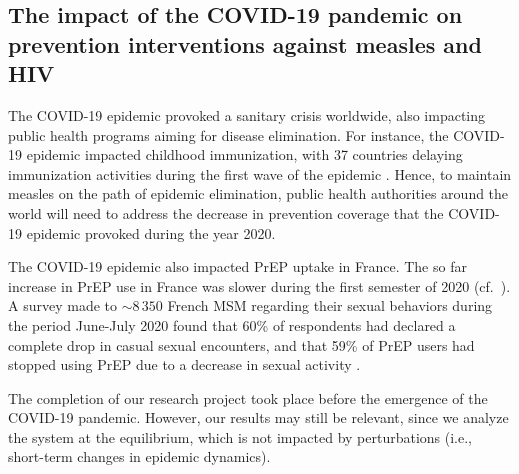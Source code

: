 \subsection{The impact of the COVID-19 pandemic on prevention interventions against measles and HIV}
The COVID-19 epidemic provoked a sanitary crisis worldwide, also impacting public health programs aiming for disease elimination. For instance, the COVID-19 epidemic impacted childhood immunization, with 37 countries delaying immunization activities during the first wave of the epidemic \cite[]{WHO_CovidMeasles}. Hence, to maintain measles on the path of epidemic elimination, public health authorities around the world will need to address the decrease in prevention coverage that the COVID-19 epidemic provoked during the year 2020. 

The COVID-19 epidemic also impacted PrEP uptake in France. The so far increase in PrEP use in France was slower during the first semester of 2020 (cf.~). A survey made to $\sim8\,350$ French MSM regarding their sexual behaviors during the period June-July 2020 found that 60\% of respondents had declared a complete drop in casual sexual encounters, and that 59\% of PrEP users had stopped using PrEP due to a decrease in sexual activity \cite[]{Velter2020}.

The completion of our research project took place before the emergence of the COVID-19 pandemic. However, our results may still be relevant, since we analyze the system at the equilibrium, which is not impacted by perturbations (i.e., short-term changes in epidemic dynamics). 

%

%

